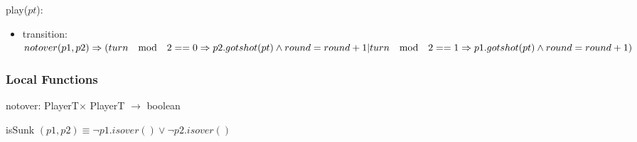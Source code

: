 \documentclass[12pt]{article}
\begin{document}
\noindent play($pt$):
\begin{itemize}
\item transition: $notover(p1,p2) \Rightarrow (turn \quad \textrm{mod} \quad 2 == 0 
\Rightarrow p2.gotshot(pt) \wedge round = round + 1\\
| turn \quad \textrm{mod}\quad 2 == 1 \Rightarrow p1.gotshot(pt) \wedge round = round + 1)$
\end{itemize}


\subsubsection* {Local Functions}
notover: PlayerT$\times$ PlayerT $\rightarrow$ boolean

\noindent isSunk $(p1,p2) \equiv \neg p1.isover() \vee \neg  p2.isover()$
\end{document}
